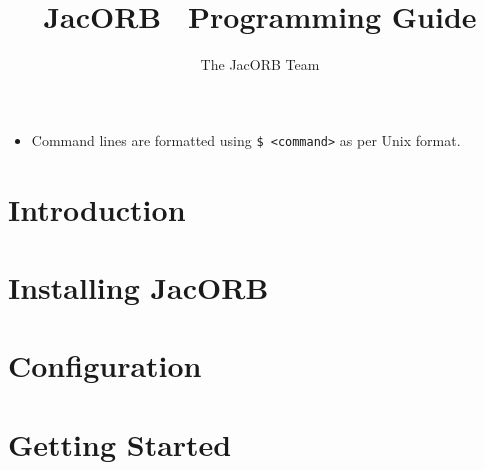 \documentclass[12pt]{scrbook}
\title{JacORB \JacORBVersion\ Programming Guide}
\author{The JacORB Team}
\begin{document}
\newcommand{\cmdline}[1]{\begin{small}\noindent \texttt{\$ #1}\end{small}}

\maketitle

\setlength{\parskip}{1.1ex}
\newpage
\tableofcontents

\label{FormatStyle}
\begin{itemize}
\item Command lines are formatted using {\tt \$ <command>} as per Unix format.
\end{itemize}


\chapter{Introduction}
\label{ch:intro}




\chapter{Installing JacORB}
\label{ch:installing}




\chapter{Configuration}
\label{ch:configuration}




\chapter{Getting Started}
\label{ch:start}


\end{document}
